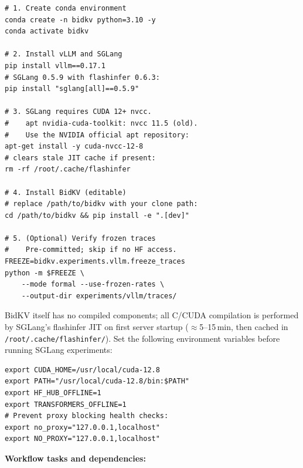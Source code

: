 \documentclass[conference]{IEEEtran}
\begin{document}
\begin{Verbatim}
# 1. Create conda environment
conda create -n bidkv python=3.10 -y
conda activate bidkv

# 2. Install vLLM and SGLang
pip install vllm==0.17.1
# SGLang 0.5.9 with flashinfer 0.6.3:
pip install "sglang[all]==0.5.9"

# 3. SGLang requires CUDA 12+ nvcc.
#    apt nvidia-cuda-toolkit: nvcc 11.5 (old).
#    Use the NVIDIA official apt repository:
apt-get install -y cuda-nvcc-12-8
# clears stale JIT cache if present:
rm -rf /root/.cache/flashinfer

# 4. Install BidKV (editable)
# replace /path/to/bidkv with your clone path:
cd /path/to/bidkv && pip install -e ".[dev]"

# 5. (Optional) Verify frozen traces
#    Pre-committed; skip if no HF access.
FREEZE=bidkv.experiments.vllm.freeze_traces
python -m $FREEZE \
    --mode formal --use-frozen-rates \
    --output-dir experiments/vllm/traces/
\end{Verbatim}


BidKV itself has no compiled components; all C/CUDA compilation
is performed by SGLang's flashinfer JIT on first server startup
($\approx$5--15\,min, then cached in \texttt{/root/.cache/flashinfer/}).
Set the following environment variables before running SGLang experiments:
\begin{Verbatim}
export CUDA_HOME=/usr/local/cuda-12.8
export PATH="/usr/local/cuda-12.8/bin:$PATH"
export HF_HUB_OFFLINE=1
export TRANSFORMERS_OFFLINE=1
# Prevent proxy blocking health checks:
export no_proxy="127.0.0.1,localhost"
export NO_PROXY="127.0.0.1,localhost"
\end{Verbatim}


\artcomp

\textbf{Workflow tasks and dependencies:}
\end{document}
